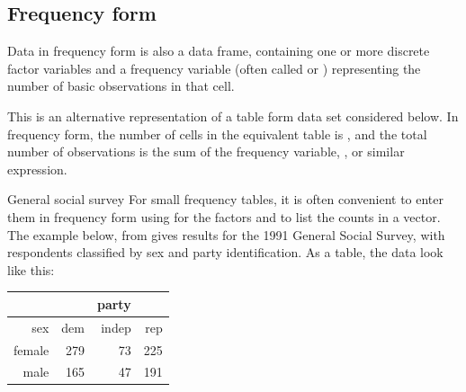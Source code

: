 \documentclass[11pt]{book}\usepackage[]{graphicx}\usepackage[]{color}
\begin{document}
\subsection{Frequency form}
Data in frequency form is also a data frame, containing
one or more discrete factor variables and a frequency variable
(often called  or )
representing the number of basic observations in that cell.

This is an alternative representation of a table form data set considered
below.
In frequency form, the number of cells in the equivalent table
is , and the total number of observations
is the sum of the frequency variable, ,
  or similar expression.

\begin{Example}[ch2-GSS]{General social survey} 
For small frequency tables, it is often convenient to enter them in frequency form
using  for the factors and  to list the counts in a vector.
The example below, from \cite{Agresti:2002} gives results for the 1991 General Social Survey,
with respondents classified by sex and party identification.
As a table, the data look like this:
\begin{center}
\begin{tabular}{rrrr}
  \hline
    &     & party & \\
  \hline
sex & dem & indep & rep \\ 
  \hline
female & 279 & 73 & 225 \\ 
  male & 165 & 47 & 191 \\ 
   \hline
\end{tabular}
\end{center}




\end{Example}
\end{document}
